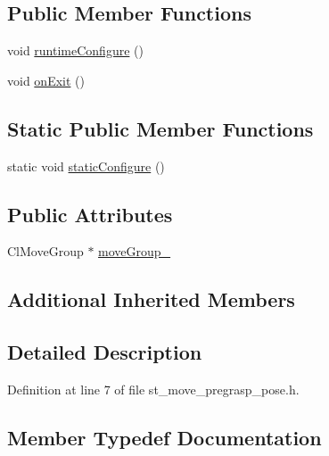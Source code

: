 \subsection*{Public Member Functions}
\begin{DoxyCompactItemize}
\item 
void \hyperlink{structsm__moveit__4_1_1pick__states_1_1StMovePregraspPose_ae9ffdf77d89169b5f4fb2cb2fadd56fc}{runtime\+Configure} ()
\item 
void \hyperlink{structsm__moveit__4_1_1pick__states_1_1StMovePregraspPose_ae2f50199e1766c1bcdb8fcd25e9a0e16}{on\+Exit} ()
\end{DoxyCompactItemize}
\subsection*{Static Public Member Functions}
\begin{DoxyCompactItemize}
\item 
static void \hyperlink{structsm__moveit__4_1_1pick__states_1_1StMovePregraspPose_afb6abd382c1c9f35dd5f74967301cc48}{static\+Configure} ()
\end{DoxyCompactItemize}
\subsection*{Public Attributes}
\begin{DoxyCompactItemize}
\item 
Cl\+Move\+Group $\ast$ \hyperlink{structsm__moveit__4_1_1pick__states_1_1StMovePregraspPose_a7ac8229ab37dba1b2eb43668e4adceea}{move\+Group\+\_\+}
\end{DoxyCompactItemize}
\subsection*{Additional Inherited Members}


\subsection{Detailed Description}


Definition at line 7 of file st\+\_\+move\+\_\+pregrasp\+\_\+pose.\+h.



\subsection{Member Typedef Documentation}
\mbox{\label{structsm__moveit__4_1_1pick__states_1_1StMovePregraspPose_a4329bf7123b5978a7418bda57b17541d}} 
